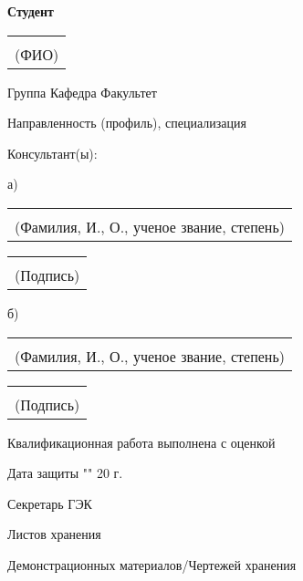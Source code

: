 \textbf{Студент} \begin{tabular}[t]{c} \underline{\hspace{5cm}} \\ {\scriptsize(ФИО)} \\ \end{tabular} Группа \underline{\hspace{2cm}} Кафедра\underline{\hspace{2cm}} Факультет \underline{\hspace{2cm}}

\bigskip

Направленность (профиль), специализация \underline{\hspace{10.5cm}}

\bigskip

Консультант(ы):

а)
\begin{tabular}[t]{c} \underline{\hspace{13.2cm}} \\ {\scriptsize(Фамилия, И., О., ученое звание, степень)} \\ \end{tabular} \begin{tabular}[t]{c} \underline{\hspace{3cm}} \\ {\scriptsize(Подпись)} \\ \end{tabular}

\bigskip

б)
\begin{tabular}[t]{c} \underline{\hspace{13.2cm}} \\ {\scriptsize(Фамилия, И., О., ученое звание, степень)} \\ \end{tabular} \begin{tabular}[t]{c} \underline{\hspace{3cm}} \\ {\scriptsize(Подпись)} \\ \end{tabular}

\vspace{2cm}

Квалификационная работа выполнена с оценкой \underline{\hspace{5cm}}


\vspace{1cm}

Дата защиты "\underline{\hspace{0.5cm}}" \underline{\hspace{4cm}} 20 \underline{\hspace{1cm}}г. \hspace{0.3cm}

\vspace{1cm}

Секретарь ГЭК \underline{\hspace{5.2cm}}

\vspace{1cm}

Листов хранения \underline{\hspace{5cm}}

\vspace{1cm}

Демонстрационных материалов/Чертежей хранения \underline{\hspace{5cm}}
